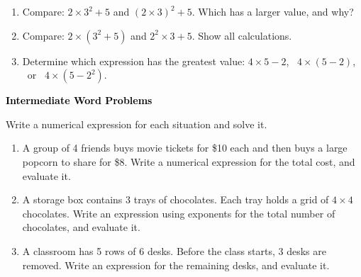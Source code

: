 \documentclass[12pt, letterpaper, fleqn]{article}
\begin{document}
\begin{enumerate}[itemsep=2.2cm, leftmargin=0.6cm]

\item Compare: $2 \times 3^2 + 5$ \quad and \quad $(2 \times 3)^2 + 5$. Which has a larger value, and why?

\vspace{2cm}

\item Compare: $2 \times (3^2 + 5)$ \quad and \quad $2^2 \times 3 + 5$. Show all calculations.

\vspace{2cm}

\item Determine which expression has the greatest value: $4 \times 5 - 2$, \ $4 \times (5 - 2)$, \ or \ $4 \times (5 - 2^2)$.

\vspace{2cm}

\end{enumerate}

\newpage

\begin{tcolorbox}[colback=black!10]
\large\textcolor{black}{\textbf{Intermediate Word Problems}}
\end{tcolorbox}

\noindent
Write a numerical expression for each situation and solve it.

\vspace{3mm}

\begin{enumerate}[itemsep=2.2cm, leftmargin=0.6cm]

\item A group of 4 friends buys movie tickets for \$10 each and then buys a large popcorn to share for \$8. Write a numerical expression for the total cost, and evaluate it.

\vspace{2.2cm}

\item A storage box contains 3 trays of chocolates. Each tray holds a grid of $4 \times 4$ chocolates. Write an expression using exponents for the total number of chocolates, and evaluate it.

\vspace{2.2cm}

\item A classroom has 5 rows of 6 desks. Before the class starts, 3 desks are removed. Write an expression for the remaining desks, and evaluate it.

\vspace{2.2cm}

\end{enumerate}
\end{document}

